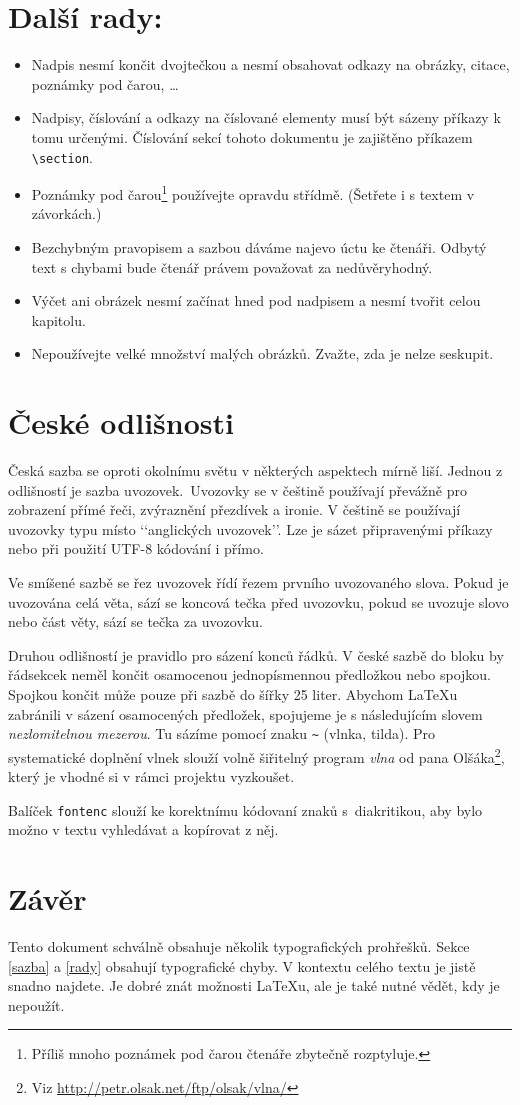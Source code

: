 \documentclass[a4paper, 10pt, twocolumn]{article}
\begin{document}
\section{\label{rady}Další rady:}
\begin{itemize}
    \item Nadpis nesmí končit dvojtečkou a nesmí obsahovat odkazy na obrázky, citace, poznámky pod čarou, \dots
    \item Nadpisy, číslování a odkazy na číslované elementy musí být sázeny příkazy k tomu určenými. Číslování sekcí tohoto dokumentu je zajištěno příkazem \verb|\section|.
    \item Poznámky pod čarou\footnote[1]{Příliš mnoho poznámek pod čarou čtenáře zbytečně rozptyluje.} používejte opravdu střídmě. (Šetřete i s textem v závorkách.)
    \item Bezchybným pravopisem a sazbou dáváme najevo úctu ke čtenáři. Odbytý text s chybami bude čtenář právem považovat za nedůvěryhodný.
    \item Výčet ani obrázek nesmí začínat hned pod nadpisem a nesmí tvořit celou kapitolu.
    \item Nepoužívejte velké množství malých obrázků. Zvažte, zda je nelze seskupit.
\end{itemize}
\section{České odlišnosti}
Česká sazba se oproti okolnímu světu v některých aspektech mírně liší. Jednou z odlišností je sazba uvozovek.~Uvozovky se v češtině používají převážně pro 
zobrazení přímé řeči, zvýraznění přezdívek a ironie. V češtině se \mbox{používají} uvozovky typu  místo ‘‘anglických uvozovek’’.
Lze je sázet připravenými příkazy nebo při použití UTF-8 kódování i přímo.
\par
Ve smíšené sazbě se řez uvozovek řídí řezem prvního uvozovaného slova.
Pokud je uvozována celá věta, sází se koncová tečka před uvozovku, pokud se uvozuje slovo nebo část věty, sází se tečka za uvozovku.
\par
Druhou odlišností je pravidlo pro sázení konců řádků.
V české sazbě do bloku by řádsekcek neměl končit osamocenou jednopísmennou předložkou nebo spojkou.
Spojkou  končit může pouze při sazbě do šířky 25 liter.
Abychom \LaTeX u zabránili v sázení osamocených předložek, spojujeme je s následujícím slovem \textit{nezlomitelnou mezerou}.
Tu sázíme pomocí znaku \texttt{\~{}} (vlnka, tilda).
Pro systematické doplnění vlnek slouží volně šiřitelný program \textit{vlna} od pana Olšáka\footnote[2]{Viz \href{http://petr.olsak.net/ftp/olsak/vlna/}{http://petr.olsak.net/ftp/olsak/vlna/}}, který je vhodné si v rámci projektu vyzkoušet.
\par
Balíček \texttt{fontenc} slouží ke korektnímu kódovaní znaků s~diakritikou, aby bylo možno v textu vyhledávat a kopírovat z něj.


\section{Závěr}
Tento dokument schválně obsahuje několik typografických prohřešků.
Sekce \ref{sazba} a \ref{rady}  obsahují typografické chyby.
V kontextu celého textu je jistě snadno najdete.
Je dobré znát možnosti \LaTeX u, ale je také nutné vědět, kdy je nepoužít.
\end{document}
